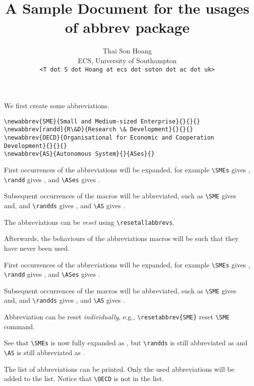 \usepackage{verbatim}
\title{A Sample Document for the usages of \textsf{abbrev} package}
\author{Thai Son Hoang\\ECS, University of Southampton\\\texttt{<T dot S dot Hoang at ecs dot soton dot ac dot uk>}}


\maketitle

We first create some abbreviations.
\begin{verbatim}
\newabbrev{SME}{Small and Medium-sized Enterprise}{}{}{}
\newabbrev[randd]{R\&D}{Research \& Development}{}{}{}
\newabbrev{OECD}{Organisational for Economic and Cooperation Development}{}{}{}
\newabbrev{AS}{Autonomous System}{}{ASes}{}
\end{verbatim}


First occurrences of the abbreviations will be expanded, for example \verb|\SMEs| gives \SMEs, \verb|\randd| gives \randd, and \verb|\ASes| gives \ASes.

Subsequent occurrences of the macros will be abbreviated, such as \verb|\SME| gives \SME and, and \verb|\randds| gives \randds, and \verb|\AS| gives \AS.

The abbreviations can be \emph{reset} using \verb|\resetallabbrevs|.
\resetallabbrevs

Afterwards, the behaviours of the abbreviations macros will be such that they have never been used.

First occurrences of the abbreviations will be expanded, for example \verb|\SMEs| gives \SMEs, \verb|\randd| gives \randd, and \verb|\ASes| gives \ASes.

Subsequent occurrences of the macros will be abbreviated, such as \verb|\SME| gives \SME and, and \verb|\randds| gives \randds, and \verb|\AS| gives \AS.
 
Abbreviation can be reset \emph{individually}, e.g., \verb|\resetabbrev{SME}| reset \verb|\SME| command.

See that \verb|\SMEs| is now fully expanded as \SMEs, but \verb|\randds| is still abbreviated as \randds and \verb|\AS| is still abbreviated as \AS.

The list of abbreviations can be printed.  Only the used abbreviations will be added to the list. Notice that \verb|\OECD| is not in the list.

\printnomenclature




